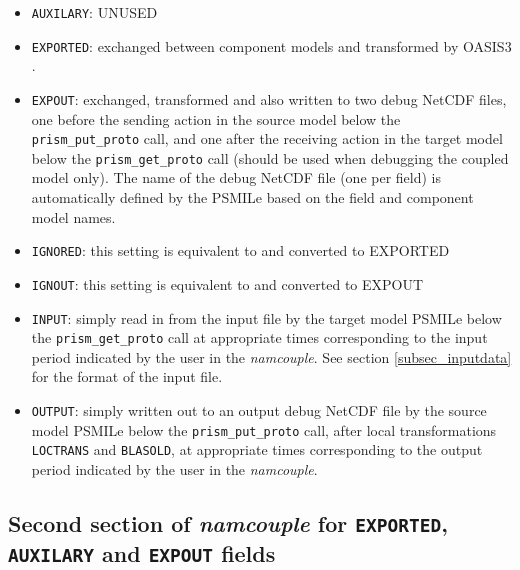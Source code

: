 \begin{itemize}
\item {\tt AUXILARY}: UNUSED
\item {\tt EXPORTED}: exchanged between component models and
  transformed by OASIS3 .
\item {\tt EXPOUT}: exchanged, transformed and also written to two
  debug NetCDF files, one before the sending action in the source model
  below the {\tt prism\_put\_proto} call, and one after the receiving
  action in the target model below the {\tt prism\_get\_proto} call (should
  be used when debugging the coupled model only). The name of the debug NetCDF file (one per field) is
  automatically defined by the PSMILe based on the field and component model names.
\item {\tt IGNORED}: this setting is equivalent to and converted to EXPORTED
\item {\tt IGNOUT}: this setting is equivalent to and converted to EXPOUT
\item {\tt INPUT}: simply read in from the input file by the target
  model PSMILe below the {\tt prism\_get\_proto} call at appropriate
  times corresponding to the input period indicated by the user in the
  {\it namcouple}. See section
  \ref{subsec_inputdata} for the format of the input file.
\item {\tt OUTPUT}: simply written out to an output debug NetCDF file by the source
  model PSMILe below the {\tt prism\_put\_proto} call, after local transformations {\tt LOCTRANS} and {\tt BLASOLD}, at appropriate
  times corresponding to the output period indicated by the user in
  the {\it namcouple}. 

\end{itemize}

\subsection{Second section of {\it namcouple} for {\tt EXPORTED}, {\tt
      AUXILARY} and {\tt EXPOUT} fields}
\label{subsubsec_secondEXPORTED}

